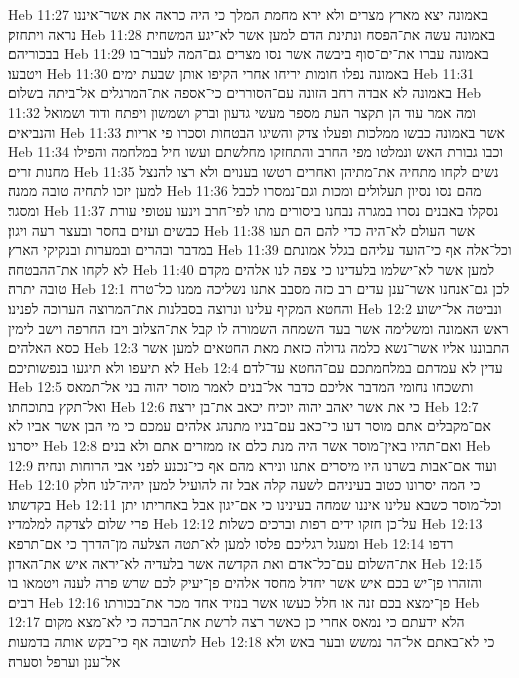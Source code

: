 Heb 11:27  באמונה יצא מארץ מצרים ולא ירא מחמת המלך כי היה כראה את אשר־איננו נראה ויתחזק׃
Heb 11:28  באמונה עשה את־הפסח ונתינת הדם למען אשר לא־יגע המשחית בבכוריהם׃
Heb 11:29  באמונה עברו את־ים־סוף ביבשה אשר נסו מצרים גם־המה לעבר־בו ויטבעו׃
Heb 11:30  באמונה נפלו חומות יריחו אחרי הקיפו אותן שבעת ימים׃
Heb 11:31  באמונה לא אבדה רחב הזונה עם־הסוררים כי־אספה את־המרגלים אל־ביתה בשלום׃
Heb 11:32  ומה אמר עוד הן תקצר העת מספר מעשי גדעון וברק ושמשון ויפתח ודוד ושמואל והנביאים׃
Heb 11:33  אשר באמונה כבשו ממלכות ופעלו צדק והשיגו הבטחות וסכרו פי אריות׃
Heb 11:34  וכבו גבורת האש ונמלטו מפי החרב והתחזקו מחלשתם ועשו חיל במלחמה והפילו מחנות זרים׃
Heb 11:35  נשים לקחו מתחיה את־מתיהן ואחרים רטשו בענוים ולא רצו להנצל למען יזכו לתחיה טובה ממנה׃
Heb 11:36  מהם נסו נסיון תעלולים ומכות וגם־נמסרו לכבל ומסגר׃
Heb 11:37  נסקלו באבנים נסרו במגרה נבחנו ביסורים מתו לפי־חרב וינעו עטופי עורת כבשים ועזים בחסר ובעצר רעה ויגון׃
Heb 11:38  אשר העולם לא־היה כדי להם הם תעו במדבר ובהרים ובמערות ובנקיקי הארץ׃
Heb 11:39  וכל־אלה אף כי־הועד עליהם בגלל אמונתם לא לקחו את־ההבטחה׃
Heb 11:40  למען אשר לא־ישלמו בלעדינו כי צפה לנו אלהים מקדם טובה יתרה׃
Heb 12:1  לכן גם־אנחנו אשר־ענן עדים רב כזה מסבב אתנו נשליכה ממנו כל־טרח והחטא המקיף עלינו ונרוצה בסבלנות את־המרוצה הערוכה לפנינו׃
Heb 12:2  ונביטה אל־ישוע ראש האמונה ומשלימה אשר בעד השמחה השמורה לו קבל את־הצלוב ויבז החרפה וישב לימין כסא האלהים׃
Heb 12:3  התבוננו אליו אשר־נשא כלמה גדולה כזאת מאת החטאים למען אשר לא תיעפו ולא תיגעו בנפשותיכם׃
Heb 12:4  עדין לא עמדתם במלחמתכם עם־החטא עד־לדם׃
Heb 12:5  ותשכחו נחומי המדבר אליכם כדבר אל־בנים לאמר מוסר יהוה בני אל־תמאס ואל־תקץ בתוכחתו׃
Heb 12:6  כי את אשר יאהב יהוה יוכיח יכאב את־בן ירצה׃
Heb 12:7  אם־מקבלים אתם מוסר דעו כי־כאב עם־בניו מתנהג אלהים עמכם כי מי הבן אשר אביו לא ייסרנו׃
Heb 12:8  ואם־תהיו באין־מוסר אשר היה מנת כלם אז ממזרים אתם ולא בנים׃
Heb 12:9  ועוד אם־אבות בשרנו היו מיסרים אתנו ונירא מהם אף כי־נכנע לפני אבי הרוחות ונחיה׃
Heb 12:10  כי המה יסרונו כטוב בעיניהם לשעה קלה אבל זה להועיל למען יהיה־לנו חלק בקדשתו׃
Heb 12:11  וכל־מוסר כשבא עלינו איננו שמחה בעינינו כי אם־יגון אבל באחריתו יתן פרי שלום לצדקה למלמדיו׃
Heb 12:12  על־כן חזקו ידים רפות וברכים כשלות׃
Heb 12:13  ומעגל רגליכם פלסו למען לא־תטה הצלעה מן־הדרך כי אם־תרפא׃
Heb 12:14  רדפו את־השלום עם־כל־אדם ואת הקדשה אשר בלעדיה לא־יראה איש את־האדון׃
Heb 12:15  והזהרו פן־יש בכם איש אשר יחדל מחסד אלהים פן־יעיק לכם שרש פרה לענה ויטמאו בו רבים׃
Heb 12:16  פן־ימצא בכם זנה או חלל כעשו אשר בנזיד אחד מכר את־בכורתו׃
Heb 12:17  הלא ידעתם כי נמאס אחרי כן כאשר רצה לרשת את־הברכה כי לא־מצא מקום לתשובה אף כי־בקש אותה בדמעות׃
Heb 12:18  כי לא־באתם אל־הר נמשש ובער באש ולא אל־ענן וערפל וסערה׃
